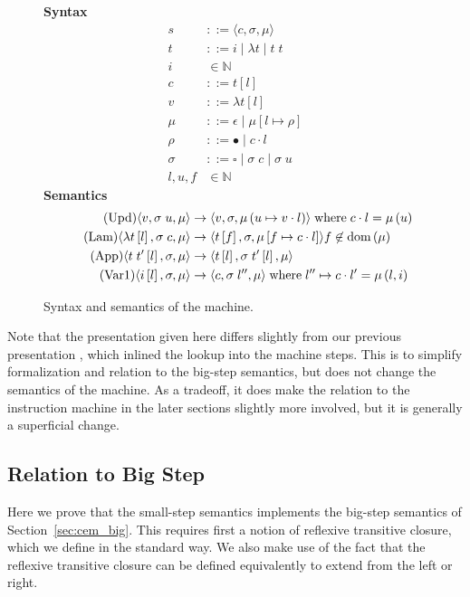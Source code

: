 \begin{figure}
\textbf{Syntax}
\begin{align*}
\tag{State} s &::= \langle c, \sigma, \mu \rangle \\
\tag{Term} t &::= i \; | \; \lambda t \; | \; t \; t  \\
\tag{Variable} i &\in \mathbb{N}  \\
\tag{Closure} c &::= t \left[l\right] \\
\tag{Value} v &::= \lambda t\left[l\right] \\
\tag{Heap} \mu &::= \epsilon \; | \; \mu \left[ l \mapsto \rho \right] \\
\tag{Environment} \rho &::= \bullet \; | \; c \cdot l \\
\tag{Stack} \sigma &::= \square \; | \; \sigma \; c \;  | \; \sigma \; u \\
\tag{Location} l,u,f &\in \mathbb{N}
\end{align*}
\textbf{Semantics}
\begin{align*}
\tag{Upd}
\langle v,  \sigma \; u , \mu \rangle 
  &\rightarrow
\langle v, \sigma, \mu\left(u \mapsto v \cdot l\right) \rangle  
\; \textnormal{where} \; c \cdot l = \mu\left(u\right) \\
\tag{Lam}
\langle \lambda t\left[l\right], \sigma \; c, \mu \rangle 
  &\rightarrow
\langle t\left[f\right], \sigma, \mu\left[f \mapsto c \cdot l\right]\rangle f
\not \in \textnormal{dom}\left(\mu\right)  \\
\tag{App}
\langle t \; t'\left[l\right], \sigma, \mu \rangle
  &\rightarrow
\langle t\left[l\right], \sigma \; t'\left[l\right], \mu \rangle \\
\tag{Var1}
\langle i\left[l\right], \sigma, \mu \rangle
  &\rightarrow
\langle c, \sigma \; l'', \mu \rangle
\; \textnormal{where} \; l'' \mapsto c \cdot l' = \mu\left(l, i\right)
\end{align*}
\caption{Syntax and semantics of the \ce machine.}
\label{fig:cesm}
\end{figure}

Note that the presentation given here differs slightly from our previous
presentation \cite{cem}, which inlined the lookup into the machine steps. This
is to simplify formalization and relation to the big-step semantics, but does not
change the semantics of the machine. As a tradeoff, it does make the relation to
the instruction machine in the later sections slightly more involved, but
it is generally a superficial change.

\subsection{Relation to Big Step}
Here we prove that the small-step semantics implements the big-step semantics of
Section~\ref{sec:cem_big}. This requires first a notion of reflexive transitive closure,
which we define in the standard way. We also make use of the fact that the
reflexive transitive closure can be defined equivalently to extend from the left
or right. 

